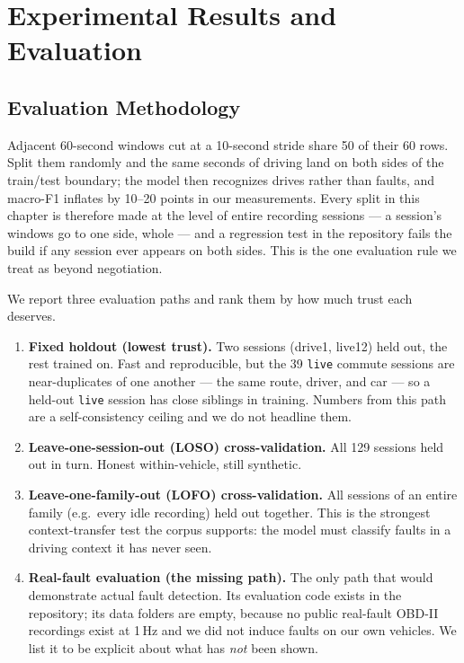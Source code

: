\section{Experimental Results and Evaluation}
\label{ch:results}

\subsection{Evaluation Methodology}
\label{sec:evalmethod}

Adjacent 60-second windows cut at a 10-second stride share 50 of their 60
rows. Split them randomly and the same seconds of driving land on both sides
of the train/test boundary; the model then recognizes drives rather than
faults, and macro-F1 inflates by 10--20 points in our measurements. Every
split in this chapter is therefore made at the level of entire recording
sessions --- a session's windows go to one side, whole --- and a regression
test in the repository fails the build if any session ever appears on both
sides. This is the one evaluation rule we treat as beyond negotiation.

We report three evaluation paths and rank them by how much trust each
deserves.

\begin{enumerate}
  \item \textbf{Fixed holdout (lowest trust).} Two sessions (drive1,
    live12) held out, the rest trained on. Fast and reproducible, but the
    39 \texttt{live} commute sessions are near-duplicates of one another
    --- the same route, driver, and car --- so a held-out \texttt{live}
    session has close siblings in training. Numbers from this path are a
    self-consistency ceiling and we do not headline them.
  \item \textbf{Leave-one-session-out (LOSO) cross-validation.} All 129
    sessions held out in turn. Honest within-vehicle, still synthetic.
  \item \textbf{Leave-one-family-out (LOFO) cross-validation.} All sessions
    of an entire family (e.g.\ every idle recording) held out together.
    This is the strongest context-transfer test the corpus supports:
    the model must classify faults in a driving context it has never seen.
  \item[--] \textbf{Real-fault evaluation (the missing path).} The only
    path that would demonstrate actual fault detection. Its evaluation code
    exists in the repository; its data folders are empty, because no public
    real-fault OBD-II recordings exist at 1\,Hz and we did not induce
    faults on our own vehicles. We list it to be explicit about what has
    \emph{not} been shown.
\end{enumerate}

